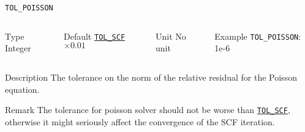 \documentclass[xcolor=dvipsnames,t]{beamer}
\begin{document}
\begin{frame}[allowframebreaks]{\texttt{TOL\_POISSON}} \label{TOL_POISSON}
\vspace*{-12pt}
\begin{columns}
\begin{block}{Type}
Integer
\end{block}

\begin{block}{Default}
\hyperlink{TOL_SCF}{\texttt{TOL\_SCF}}$\times 0.01$
\end{block}

\begin{block}{Unit}
No unit
\end{block}

\begin{block}{Example}
\texttt{TOL\_POISSON}: 1e-6
\end{block}
\end{columns}

\begin{block}{Description}
The tolerance on the norm of the relative residual for the Poisson equation.
\end{block}

\begin{block}{Remark}
The tolerance for poisson solver should not be worse than \hyperlink{TOL_SCF}{\texttt{TOL\_SCF}}, otherwise it might seriously affect  the convergence of the SCF iteration.
\end{block}

\end{frame}
\end{document}
